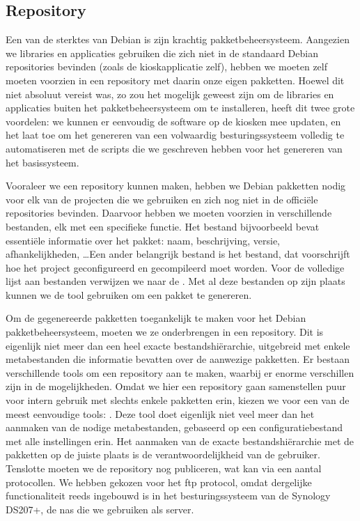 \subsection{Repository}
\label{kiosk:deployment:besturingssysteem:repository}

Een van de sterktes van Debian is zijn krachtig pakketbeheersysteem. Aangezien we libraries en applicaties gebruiken die zich niet in de standaard Debian repositories bevinden (zoals de kioskapplicatie zelf), hebben we moeten zelf moeten voorzien in een repository met daarin onze eigen pakketten. Hoewel dit niet absoluut vereist was, zo zou het mogelijk geweest zijn om de libraries en applicaties buiten het pakketbeheersysteem om te installeren, heeft dit twee grote voordelen: we kunnen er eenvoudig de software op de kiosken mee updaten, en het laat toe om het genereren van een volwaardig besturingssysteem volledig te automatiseren met de scripts die we geschreven hebben voor het genereren van het basissysteem.

Vooraleer we een repository kunnen maken, hebben we Debian pakketten nodig voor elk van de projecten die we gebruiken en zich nog niet in de officiële repositories bevinden. Daarvoor hebben we moeten voorzien in verschillende bestanden, elk met een specifieke functie. Het  bestand bijvoorbeeld bevat essentiële informatie over het pakket: naam, beschrijving, versie, afhankelijkheden, \ldots Een ander belangrijk bestand is het  bestand, dat voorschrijft hoe het project geconfigureerd en gecompileerd moet worden. Voor de volledige lijst aan bestanden verwijzen we naar de . Met al deze bestanden op zijn plaats kunnen we de  tool gebruiken om een pakket te genereren.


Om de gegenereerde pakketten toegankelijk te maken voor het Debian pakketbeheersysteem, moeten we ze onderbrengen in een repository. Dit is eigenlijk niet meer dan een heel exacte bestandshiërarchie, uitgebreid met enkele metabestanden die informatie bevatten over de aanwezige pakketten. Er bestaan verschillende tools om een repository aan te maken, waarbij er enorme verschillen zijn in de mogelijkheden. Omdat we hier een repository gaan samenstellen puur voor intern gebruik met slechts enkele pakketten erin, kiezen we voor een van de meest eenvoudige tools: . Deze tool doet eigenlijk niet veel meer dan het aanmaken van de nodige metabestanden, gebaseerd op een configuratiebestand met alle instellingen erin. Het aanmaken van de exacte bestandshiërarchie met de pakketten op de juiste plaats is de verantwoordelijkheid van de gebruiker.
Tenslotte moeten we de repository nog publiceren, wat kan via een aantal protocollen. We hebben gekozen voor het \ac{ftp} protocol, omdat dergelijke functionaliteit reeds ingebouwd is in het besturingssysteem van de Synology DS207+, de \ac{nas} die we gebruiken als server.

